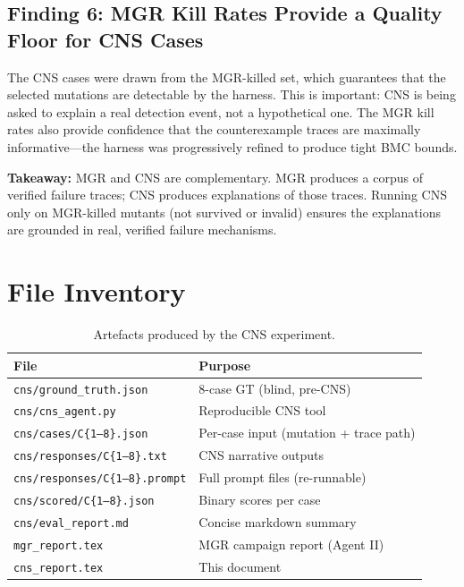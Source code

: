 \documentclass[11pt,a4paper]{article}
\begin{document}
\subsection{Finding 6: MGR Kill Rates Provide a Quality Floor for CNS Cases}

The CNS cases were drawn from the MGR-killed set, which guarantees that the
selected mutations are detectable by the harness. This is important: CNS is
being asked to explain a real detection event, not a hypothetical one. The MGR
kill rates also provide confidence that the counterexample traces are maximally
informative---the harness was progressively refined to produce tight
BMC bounds.

\textbf{Takeaway:} MGR and CNS are complementary. MGR produces a corpus of
verified failure traces; CNS produces explanations of those traces. Running
CNS only on MGR-killed mutants (not survived or invalid) ensures the
explanations are grounded in real, verified failure mechanisms.

\section{File Inventory}

\begin{table}[H]
\centering
\caption{Artefacts produced by the CNS experiment.}
\label{tab:files}
\begin{tabular}{ll}
\toprule
\textbf{File} & \textbf{Purpose} \\
\midrule
\texttt{cns/ground\_truth.json}      & 8-case GT (blind, pre-CNS) \\
\texttt{cns/cns\_agent.py}           & Reproducible CNS tool \\
\texttt{cns/cases/C\{1--8\}.json}    & Per-case input (mutation + trace path) \\
\texttt{cns/responses/C\{1--8\}.txt} & CNS narrative outputs \\
\texttt{cns/responses/C\{1--8\}.prompt} & Full prompt files (re-runnable) \\
\texttt{cns/scored/C\{1--8\}.json}   & Binary scores per case \\
\texttt{cns/eval\_report.md}         & Concise markdown summary \\
\texttt{mgr\_report.tex}             & MGR campaign report (Agent II) \\
\texttt{cns\_report.tex}             & This document \\
\bottomrule
\end{tabular}
\end{table}
\end{document}
